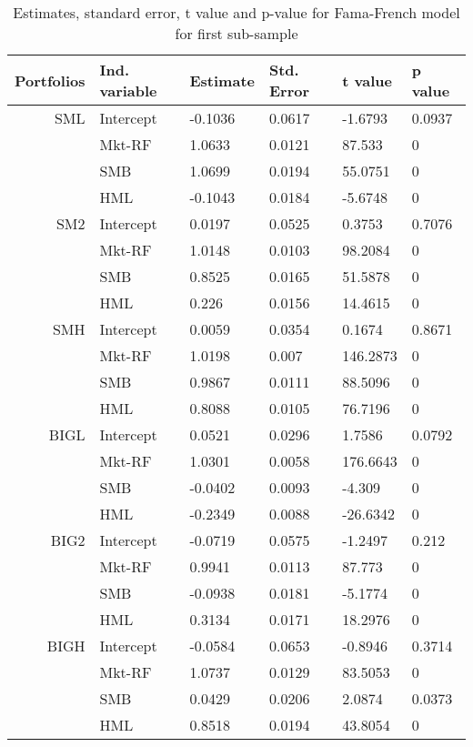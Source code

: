 \documentclass[11pt]{article}
\begin{document}
\begin{table}[ht]
\centering
\begin{tabular}{rlllll}
  \hline
 Portfolios&Ind. variable& Estimate & Std. Error & t value & p value \\ 
  \hline
SML & Intercept & -0.1036 & 0.0617 & -1.6793 & 0.0937 \\ 
   & Mkt-RF & 1.0633 & 0.0121 & 87.533 & 0 \\ 
   & SMB & 1.0699 & 0.0194 & 55.0751 & 0 \\ 
   & HML & -0.1043 & 0.0184 & -5.6748 & 0 \\ 
  SM2 & Intercept & 0.0197 & 0.0525 & 0.3753 & 0.7076 \\ 
   & Mkt-RF & 1.0148 & 0.0103 & 98.2084 & 0 \\ 
   & SMB & 0.8525 & 0.0165 & 51.5878 & 0 \\ 
   & HML & 0.226 & 0.0156 & 14.4615 & 0 \\ 
  SMH & Intercept & 0.0059 & 0.0354 & 0.1674 & 0.8671 \\ 
   & Mkt-RF & 1.0198 & 0.007 & 146.2873 & 0 \\ 
   & SMB & 0.9867 & 0.0111 & 88.5096 & 0 \\ 
   & HML & 0.8088 & 0.0105 & 76.7196 & 0 \\ 
  BIGL & Intercept & 0.0521 & 0.0296 & 1.7586 & 0.0792 \\ 
   & Mkt-RF & 1.0301 & 0.0058 & 176.6643 & 0 \\ 
   & SMB & -0.0402 & 0.0093 & -4.309 & 0 \\ 
   & HML & -0.2349 & 0.0088 & -26.6342 & 0 \\ 
  BIG2 & Intercept & -0.0719 & 0.0575 & -1.2497 & 0.212 \\ 
   & Mkt-RF & 0.9941 & 0.0113 & 87.773 & 0 \\ 
   & SMB & -0.0938 & 0.0181 & -5.1774 & 0 \\ 
   & HML & 0.3134 & 0.0171 & 18.2976 & 0 \\ 
  BIGH & Intercept & -0.0584 & 0.0653 & -0.8946 & 0.3714 \\ 
   & Mkt-RF & 1.0737 & 0.0129 & 83.5053 & 0 \\ 
   & SMB & 0.0429 & 0.0206 & 2.0874 & 0.0373 \\ 
   & HML & 0.8518 & 0.0194 & 43.8054 & 0 \\ 
   \hline
\end{tabular}
\caption{ Estimates, standard error, t value and p-value for Fama-French model for first sub-sample}\label{tab5}
\end{table}
\end{document}
